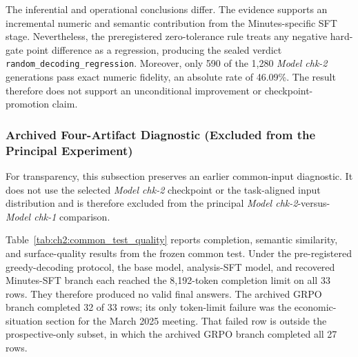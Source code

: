 The inferential and operational conclusions differ. The evidence supports an
incremental numeric and semantic contribution from the Minutes-specific SFT
stage. Nevertheless, the preregistered zero-tolerance rule treats any negative
hard-gate point difference as a regression, producing the sealed verdict
\texttt{random\_decoding\_regression}. Moreover, only 590 of the 1,280
\textit{Model chk-2} generations pass exact numeric fidelity, an absolute rate
of 46.09\%. The result therefore does not support an unconditional improvement
or checkpoint-promotion claim.

\iffalse
\subsubsection*{Archived Four-Artifact Diagnostic (Excluded from the Principal Experiment)}

For transparency, this subsection preserves an earlier common-input diagnostic.
It does not use the selected \textit{Model chk-2} checkpoint or the task-aligned input
distribution and is therefore excluded from the principal
\textit{Model chk-2}-versus-\textit{Model chk-1} comparison.

Table~\ref{tab:ch2:common_test_quality} reports completion, semantic
similarity, and surface-quality results from the frozen common test.  Under
the pre-registered greedy-decoding protocol, the base model, analysis-SFT
model, and recovered Minutes-SFT branch each reached the 8,192-token
completion limit on all 33 rows.  They therefore produced no valid final
answers.  The archived GRPO branch completed 32 of 33 rows; its only
token-limit failure was the economic-situation section for the March 2025
meeting.  That failed row is outside the prospective-only subset, in which
the archived GRPO branch completed all 27 rows.

